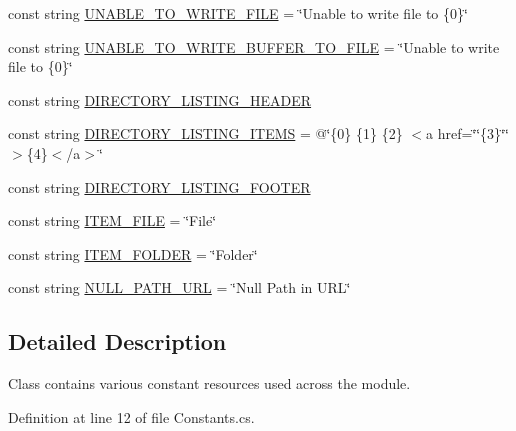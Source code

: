 \begin{DoxyCompactItemize}
const string \mbox{\hyperlink{class_concord_1_1_c3_http_module_1_1_constants_adf8bf81fd05fc55fa9fe9949ee910137}{U\+N\+A\+B\+L\+E\+\_\+\+T\+O\+\_\+\+W\+R\+I\+T\+E\+\_\+\+F\+I\+LE}} = \char`\"{}Unable to write file to \{0\}\char`\"{}
\item 
const string \mbox{\hyperlink{class_concord_1_1_c3_http_module_1_1_constants_a367b84805aa64ef3039e0f15b4387aef}{U\+N\+A\+B\+L\+E\+\_\+\+T\+O\+\_\+\+W\+R\+I\+T\+E\+\_\+\+B\+U\+F\+F\+E\+R\+\_\+\+T\+O\+\_\+\+F\+I\+LE}} = \char`\"{}Unable to write file to \{0\}\char`\"{}
\item 
const string \mbox{\hyperlink{class_concord_1_1_c3_http_module_1_1_constants_a9f0480d281c49fc6281218cbafb4e209}{D\+I\+R\+E\+C\+T\+O\+R\+Y\+\_\+\+L\+I\+S\+T\+I\+N\+G\+\_\+\+H\+E\+A\+D\+ER}}
\item 
const string \mbox{\hyperlink{class_concord_1_1_c3_http_module_1_1_constants_acc82d0b9ff36b4af4111cb7aab5a5399}{D\+I\+R\+E\+C\+T\+O\+R\+Y\+\_\+\+L\+I\+S\+T\+I\+N\+G\+\_\+\+I\+T\+E\+MS}} = @\char`\"{}\{0\} \{1\} \{2\} $<$a href=\char`\"{}\char`\"{}\{3\}\char`\"{}\char`\"{}$>$\{4\}$<$/a$>$\char`\"{}
\item 
const string \mbox{\hyperlink{class_concord_1_1_c3_http_module_1_1_constants_a04851b71973f156a4cd22728b0f719af}{D\+I\+R\+E\+C\+T\+O\+R\+Y\+\_\+\+L\+I\+S\+T\+I\+N\+G\+\_\+\+F\+O\+O\+T\+ER}}
\item 
const string \mbox{\hyperlink{class_concord_1_1_c3_http_module_1_1_constants_a357cf916a1668c7fd0cde82533a0f377}{I\+T\+E\+M\+\_\+\+F\+I\+LE}} = \char`\"{}File\char`\"{}
\item 
const string \mbox{\hyperlink{class_concord_1_1_c3_http_module_1_1_constants_af8d67073bcd3e7d3448c122d4269f8c0}{I\+T\+E\+M\+\_\+\+F\+O\+L\+D\+ER}} = \char`\"{}Folder\char`\"{}
\item 
const string \mbox{\hyperlink{class_concord_1_1_c3_http_module_1_1_constants_ad7d6a3ac4038b05b6ff9a715d1a2caf4}{N\+U\+L\+L\+\_\+\+P\+A\+T\+H\+\_\+\+U\+RL}} = \char`\"{}Null Path in U\+RL\char`\"{}
\end{DoxyCompactItemize}


\subsection{Detailed Description}
Class contains various constant resources used across the module. 



Definition at line 12 of file Constants.\+cs.



